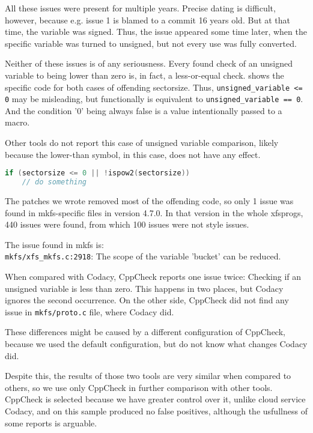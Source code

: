 All these issues were present for multiple years. Precise dating is
difficult, however, because e.g. issue 1 is blamed to a commit 16 years
old. But at that time, the variable was signed. Thus, the issue appeared
some time later, when the specific variable was turned to unsigned, but not
every use was fully converted.

Neither of these issues is of any seriousness. Every found check of an
unsigned variable to being lower than zero is, in fact, a less-or-equal
check.  shows the specific code for both cases
of offending sectorsize. Thus, {\tt unsigned\_variable <= 0} may be
misleading, but functionally is equivalent to {\tt unsigned\_variable ==
0}.  And the condition '0' being always false is a value intentionally
passed to a macro.

Other tools do not report this case of unsigned variable comparison,
likely because the lower-than symbol, in this case, does not have any effect.

\begin{lstlisting}[frame=none, basicstyle=\footnotesize\ttfamily,
language=C, numbers=none, numberstyle=\tiny\color{black},caption=
{Condition in which unsigned sectorsize is tested to be less than zero.},
label={lst:results:sectorsize}]
if (sectorsize <= 0 || !ispow2(sectorsize))
	// do something
\end{lstlisting}

The patches we wrote removed most of the offending code, so only 1 issue was
found in mkfs-specific files in version 4.7.0. In that version in the whole
xfsprogs, 440 issues were found, from which 100 issues were not style issues.

The issue found in mkfs  is:\\
{\tt mkfs/xfs\_mkfs.c:2918}: The scope of the variable 'bucket' can be reduced.

When compared with Codacy, CppCheck reports one issue twice: Checking if an
unsigned variable is less than zero. This happens in two places, but Codacy
ignores the second occurrence. On the other side, CppCheck did not find any
issue in {\tt mkfs/proto.c} file, where Codacy did.

These differences might be caused by a different configuration of CppCheck,
because we used the default configuration, but do not know what changes
Codacy did.

Despite this, the results of those two tools are very similar when compared
to others, so we use only CppCheck in further comparison with other tools.
CppCheck is selected because we have greater control over it, unlike cloud
service Codacy, and on this sample produced no false positives, although the
usfullness of some reports is arguable.

